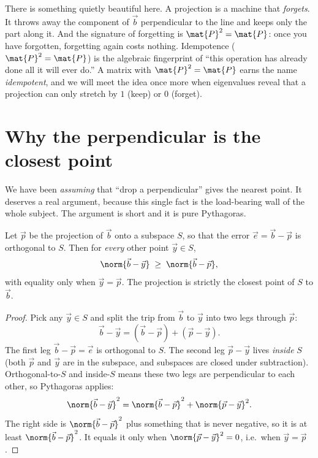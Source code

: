 \begin{aestheticbox}
There is something quietly beautiful here. A projection is a machine that \emph{forgets}. It throws
away the component of $\vec{b}$ perpendicular to the line and keeps only the part along it. And the
signature of forgetting is $\mat{P}^2=\mat{P}$: once you have forgotten, forgetting again costs
nothing. Idempotence ($\mat{P}^2=\mat{P}$) is the algebraic fingerprint of ``this operation has
already done all it will ever do.'' A matrix with $\mat{P}^2=\mat{P}$ earns the name
\emph{idempotent}, and we will meet the idea once more when eigenvalues reveal that a projection can
only stretch by $1$ (keep) or $0$ (forget).
\end{aestheticbox}

\section{Why the perpendicular is the closest point}

We have been \emph{assuming} that ``drop a perpendicular'' gives the nearest point. It deserves a
real argument, because this single fact is the load-bearing wall of the whole subject. The argument
is short and it is pure Pythagoras.

\begin{theorem}\label{ch18:closest-thm}
Let $\vec{p}$ be the projection of $\vec{b}$ onto a subspace $S$, so that the error
$\vec{e}=\vec{b}-\vec{p}$ is orthogonal to $S$. Then for \emph{every} other point $\vec{y}\in S$,
\[
  \norm{\vec{b}-\vec{y}} \;\ge\; \norm{\vec{b}-\vec{p}},
\]
with equality only when $\vec{y}=\vec{p}$. The projection is strictly the closest point of $S$ to
$\vec{b}$.
\end{theorem}

\begin{proof}
Pick any $\vec{y}\in S$ and split the trip from $\vec{b}$ to $\vec{y}$ into two legs through
$\vec{p}$:
\[
  \vec{b}-\vec{y} = (\vec{b}-\vec{p}) + (\vec{p}-\vec{y}).
\]
The first leg $\vec{b}-\vec{p}=\vec{e}$ is orthogonal to $S$. The second leg $\vec{p}-\vec{y}$
lives \emph{inside} $S$ (both $\vec{p}$ and $\vec{y}$ are in the subspace, and subspaces are closed
under subtraction). Orthogonal-to-$S$ and inside-$S$ means these two legs are perpendicular to each
other, so Pythagoras applies:
\[
  \norm{\vec{b}-\vec{y}}^2 = \norm{\vec{b}-\vec{p}}^2 + \norm{\vec{p}-\vec{y}}^2.
\]
The right side is $\norm{\vec{b}-\vec{p}}^2$ plus something that is never negative, so it is at
least $\norm{\vec{b}-\vec{p}}^2$. It equals it only when $\norm{\vec{p}-\vec{y}}^2=0$, i.e.\ when
$\vec{y}=\vec{p}$.
\end{proof}

